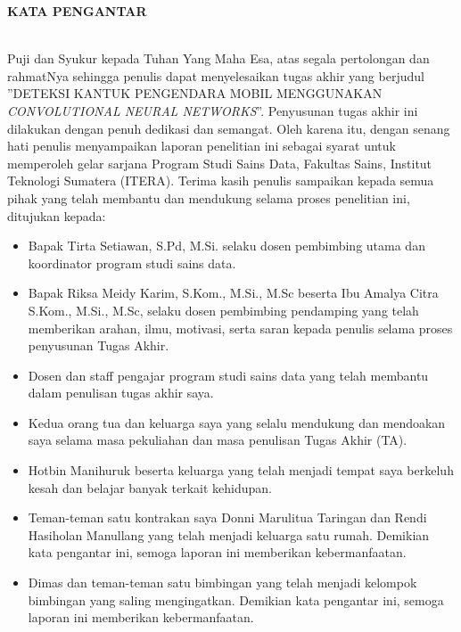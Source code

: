 \clearpage

\normalsize \bfseries \centering \MakeUppercase{Kata Pengantar}
% 
\thispagestyle{fancy}
\fancyhf{}
\fancyhead[R]{\thepage}
\\[2\baselineskip]

\normalsize \normalfont \justifying
    Puji dan Syukur kepada Tuhan Yang Maha Esa, atas segala pertolongan dan rahmatNya sehingga penulis dapat menyelesaikan tugas akhir yang berjudul ”DETEKSI KANTUK PENGENDARA MOBIL MENGGUNAKAN\textit{ CONVOLUTIONAL NEURAL NETWORKS}”.
    Penyusunan tugas akhir ini dilakukan dengan penuh dedikasi dan semangat. Oleh
    karena itu, dengan senang hati penulis menyampaikan laporan penelitian ini sebagai syarat untuk memperoleh gelar sarjana Program Studi Sains Data, Fakultas
    Sains, Institut Teknologi Sumatera (ITERA). Terima kasih penulis sampaikan kepada semua pihak yang telah membantu dan mendukung selama proses penelitian
    ini, ditujukan kepada:

        \begin{itemize}
        
        \item Bapak Tirta Setiawan, S.Pd, M.Si. selaku dosen pembimbing utama dan koordinator program studi sains data.
        
        \item Bapak Riksa Meidy Karim, S.Kom., M.Si., M.Sc beserta Ibu Amalya Citra S.Kom., M.Si., M.Sc, selaku dosen pembimbing pendamping yang telah memberikan arahan, ilmu, motivasi, serta saran kepada penulis selama proses penyusunan Tugas Akhir.
        
        \item Dosen dan staff pengajar program studi sains data yang telah membantu dalam penulisan tugas akhir saya.
        
        \item Kedua orang tua dan keluarga saya yang selalu mendukung dan mendoakan saya selama masa pekuliahan dan masa penulisan Tugas Akhir (TA).

        \item Hotbin Manihuruk beserta keluarga yang telah menjadi tempat saya berkeluh kesah dan belajar banyak terkait kehidupan.
        
        \item Teman-teman satu kontrakan saya Donni Marulitua Taringan dan Rendi Hasiholan Manullang yang telah menjadi keluarga satu rumah.
        Demikian kata pengantar ini, semoga laporan ini memberikan kebermanfaatan.

        \item Dimas dan teman-teman satu bimbingan yang telah menjadi kelompok bimbingan yang saling mengingatkan.
        Demikian kata pengantar ini, semoga laporan ini memberikan kebermanfaatan.
        
        \end{itemize}


\clearpage
